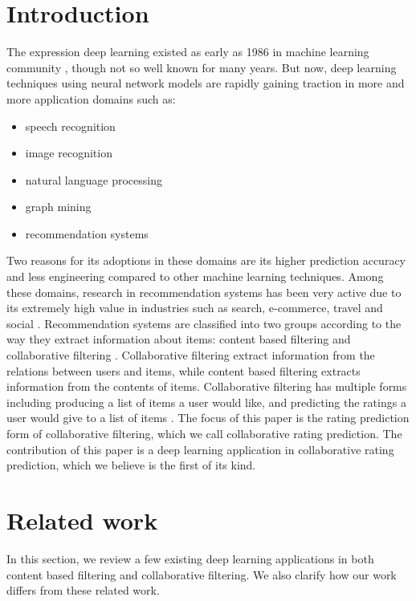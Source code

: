 \documentclass[letterpaper]{article}
\begin{document}
\section{Introduction}
The expression deep learning existed as early as 1986 in machine learning 
community \citeauthor{dechter1986learning}, though not so well known for many 
years.
But now, deep learning techniques using neural network models are rapidly 
gaining traction in more and more application domains 
such as:
\begin{itemize}
	\item speech recognition \citeauthor{hannun2014deep}
	\item image recognition \citeauthor{simonyan2014very}
	\item natural language processing \citeauthor{yao2013recurrent}
	\item graph mining \citeauthor{grovernode2vec}
	\item recommendation systems \citeauthor{barkan2016item2vec}
\end{itemize}
Two reasons for its adoptions in these domains are its higher prediction 
accuracy and less engineering compared to other machine learning techniques.
Among these domains, research in recommendation systems has been very active  
due to its extremely high value in industries such as search, e-commerce, 
travel and social \citeauthor{buettner2016predicting}.
Recommendation systems are classified into two groups according to the way they 
extract information about items: content based filtering and collaborative 
filtering \citeauthor{ricci2011introduction}.
Collaborative filtering extract information from the relations between users 
and items, while content based filtering extracts information from the contents 
of items.
Collaborative filtering has multiple forms including producing a list of items 
a user would like, and predicting the ratings a user would give to a list of 
items \citeauthor{su2009survey}.
The focus of this paper is the rating prediction form of collaborative 
filtering, which we call collaborative rating prediction.
The contribution of this paper is a deep learning application in 
collaborative rating prediction, which we believe is the first of its kind.

\section{Related work}
In this section,
we review a few existing deep learning applications in both content based 
filtering and collaborative filtering.
We also clarify how our work differs from these related work.
\end{document}
